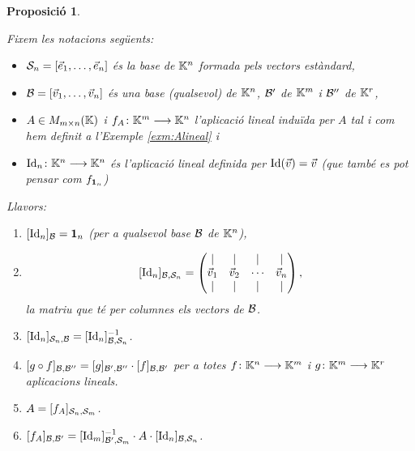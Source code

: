 \documentclass[
  11pt,
]{book}
\numberwithin{dummy}{section}
\theoremstyle{maincolornumbox}
\theoremstyle{blacknumex}
\theoremstyle{blacknumbox}
\theoremstyle{maincolornum}
\newtheorem{propositionT}{Proposició}[chapter]
\newenvironment{proposition}{\begin{pBox}\begin{propositionT}}{\end{propositionT}\end{pBox}}
\begin{document}
\begin{proposition}
\protect\hypertarget{prp:canvibase}{}\label{prp:canvibase}

Fixem les notacions següents:

\begin{itemize}
\item
  \(\mathcal{S}_n=[\vec e_1, \dots, \vec e_n]\) és la base de \(\mathbb{K}^n\) formada
  pels vectors estàndard,
\item
  \(\mathcal{B}=[\vec v_1, \dots,\vec v_n]\) és una base (qualsevol) de
  \(\mathbb{K}^n\), \(\mathcal{B}'\) de \(\mathbb{K}^m\) i \(\mathcal{B}''\) de \(\mathbb{K}^r\),
\item
  \(A\in M_{m\times n}(\mathbb{K})\) i \(f_A\colon \mathbb{K}^m\longrightarrow \mathbb{K}^n\) l'aplicació
  lineal induïda per \(A\) tal i com hem definit a l'Exemple
  \ref{exm:Alineal} i
\item
  \(\operatorname{Id}_n\colon\mathbb{K}^n \longrightarrow \mathbb{K}^n\) és l'aplicació lineal definida per
  \(\operatorname{Id}(\vec v)=\vec v\) (que també es pot pensar com \(f_{\mathbf{1}_n}\))
\end{itemize}

Llavors:

\begin{enumerate}
\def\labelenumi{\arabic{enumi}.}
\item
  \([\operatorname{Id}_n]_{\mathcal{B}}=\mathbf{1}_n\) (per a qualsevol base \(\mathcal{B}\) de \(\mathbb{K}^n\)),
\item
  \[[\operatorname{Id}_n]_{\mathcal{B},\mathcal{S}_n}=  \begin{pmatrix}
              \mid & \mid &\mid & \mid\\
              \vec v_1 & \vec v_2 &\cdots&\vec v_n\\
              \mid & \mid &\mid & \mid
              \end{pmatrix},\] la matriu que té per columnes els vectors
  de \(\mathcal{B}\).
\item
  \([\operatorname{Id}_n]_{\mathcal{S}_n,\mathcal{B}}=[\operatorname{Id}_n]_{\mathcal{B},\mathcal{S}_n}^{-1}\).
\item
  \([g\circ f]_{\mathcal{B},\mathcal{B}''}=[g]_{\mathcal{B}',\mathcal{B}''}\cdot[f]_{\mathcal{B},\mathcal{B}'}\)
  per a totes \(f\colon \mathbb{K}^n\longrightarrow \mathbb{K}^m\) i \(g\colon \mathbb{K}^m\longrightarrow\mathbb{K}^r\)
  aplicacions lineals.
\item
  \(A=[f_A]_{\mathcal{S}_n,\mathcal{S}_m}\).
\item
  \([f_A]_{\mathcal{B},\mathcal{B}'}= [\operatorname{Id}_m]_{\mathcal{B}',\mathcal{S}_m}^{-1} \cdot A \cdot [\operatorname{Id}_n]_{\mathcal{B},\mathcal{S}_n}\).
\end{enumerate}

\end{proposition}
\end{document}

